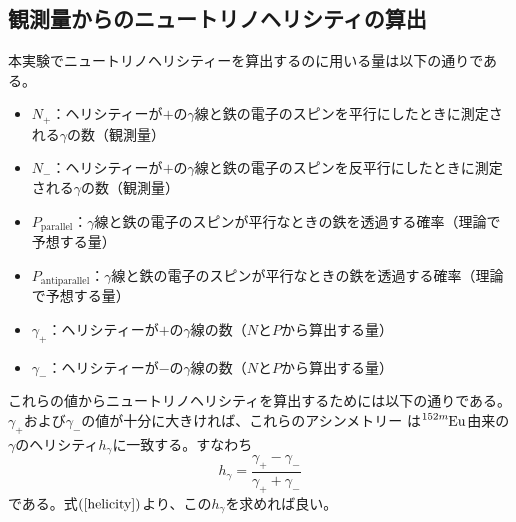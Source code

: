 \documentclass[dvipdfmx]{jreport}
\begin{document}
\subsection{観測量からのニュートリノヘリシティの算出}
本実験でニュートリノヘリシティーを算出するのに用いる量は以下の通りである。
\begin{itemize}
\item $N_{+}$：ヘリシティーが$+$の$\gamma$線と鉄の電子のスピンを平行にしたときに測定される$\gamma$の数（観測量）
\item $N_{-}$：ヘリシティーが$+$の$\gamma$線と鉄の電子のスピンを反平行にしたときに測定される$\gamma$の数（観測量）
\item $P_{\mathrm{parallel}}$：$\gamma$線と鉄の電子のスピンが平行なときの鉄を透過する確率（理論で予想する量）
\item $P_{\mathrm{anti parallel}}$：$\gamma$線と鉄の電子のスピンが平行なときの鉄を透過する確率（理論で予想する量）
\item $\gamma_{+}$：ヘリシティーが$+$の$\gamma$線の数（$N$と$P$から算出する量）
\item $\gamma_{-}$：ヘリシティーが$-$の$\gamma$線の数（$N$と$P$から算出する量）
\end{itemize}
これらの値からニュートリノヘリシティを算出するためには以下の通りである。$\gamma_{+}$および$\gamma_{-}$の値が十分に大きければ、これらのアシンメトリー
は$\ce{^{152m}Eu}$由来の$\gamma$のヘリシティ$h_{\gamma}$に一致する。すなわち
\begin{equation}
  h_{\gamma} = \frac{\gamma_{+} - \gamma_{-}}{\gamma_{+} + \gamma_{-}}
\end{equation}
である。式$\qty(\ref{helicity})$より、この$h_{\gamma}$を求めれば良い。
\end{document}
